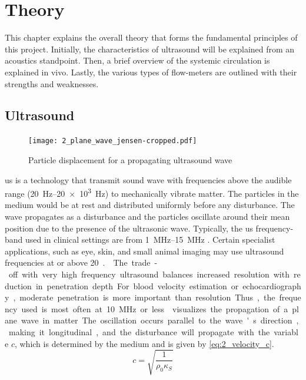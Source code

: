 \chapter{Theory} \label{cha:theory} %
This chapter explains the overall theory that forms the fundamental principles of this project. Initially, the characteristics of ultrasound will be explained from an acoustics standpoint. Then, a brief overview of the systemic circulation is explained in vivo. Lastly, the various types of flow-meters are outlined with their strengths and weaknesses.
\section{Ultrasound}
\begin{figure}[htbp]
	\centering
	\texttt{[image: 2\_plane\_wave\_jensen-cropped.pdf]}
	\caption[Particle displacement for a propagating ultrasound wave]{Particle displacement for a propagating ultrasound wave \cite{JensenUltrasoundBook}}
	\label{fig:2_planewave_jensen}
\end{figure}
\gls{us} is a technology that transmit sound wave with frequencies above the audible range (\qtyrange[range-units = single]{20}{20e3}{\hertz}) to mechanically vibrate matter. The particles in the medium would be at rest and distributed uniformly before any disturbance. The wave propagates as a disturbance and the particles oscillate around their mean position due to the presence of the ultrasonic wave. Typically, the \gls{us} frequency-band used in clinical settings are from \qtyrange[range-units = single]{1}{15}{\mega\hertz} \cite{Szabo_UltrasoundBook_2}. Certain specialist applications, such as eye, skin, and small animal imaging may use ultrasound frequencies at or above \qty{20}{\mega\hertz.} \cite{Winckler2012}. The trade-off with very high frequency ultrasound balances increased resolution with reduction in penetration depth. For blood velocity estimation or echocardiography, moderate penetration is more important than resolution. Thus, the frequency used is most often at \qty{10}{\mega\hertz} or less.  visualizes the propagation of a plane wave in matter. The oscillation occurs parallel to the wave's direction, making it longitudinal, and the disturbance will propagate with the variable $c$, which is determined by the medium and is given by \cref{eq:2_velocity_c}.
\begin{equation} \label{eq:2_velocity_c}
	c = \sqrt{\frac{1}{\rho_{0} \kappa_{S}}}
\end{equation}
